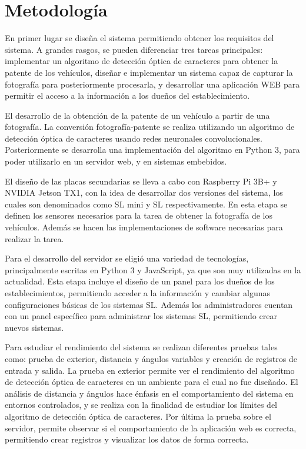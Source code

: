 \section{Metodología}

En primer lugar se diseña el sistema permitiendo obtener los requisitos del sistema. A grandes rasgos, se pueden diferenciar tres tareas principales: implementar un algoritmo de detección óptica de caracteres para obtener la patente de los vehículos, diseñar e implementar un sistema capaz de capturar la fotografía para posteriormente procesarla, y desarrollar una aplicación WEB para permitir el acceso a la información a los dueños del establecimiento.

El desarrollo de la obtención de la patente de un vehículo a partir de una fotografía. La conversión fotografía-patente se realiza utilizando un algoritmo de detección óptica de caracteres usando redes neuronales convolucionales. Posteriormente se desarrolla una implementación del algoritmo en Python 3, para poder utilizarlo en un servidor web, y en sistemas embebidos.

El diseño de las placas secundarias se lleva a cabo con Raspberry Pi 3B+ y NVIDIA Jetson TX1, con la idea de desarrollar dos versiones del sistema, los cuales son denominados como SL mini y SL respectivamente. En esta etapa se definen los sensores necesarios para la tarea de obtener la fotografía de los vehículos. Además se hacen las implementaciones de software necesarias para realizar la tarea.

Para el desarrollo del servidor se eligió una variedad de tecnologías, principalmente escritas en Python 3 y JavaScript, ya que son muy utilizadas en la actualidad. Esta etapa incluye el diseño de un panel para los dueños de los establecimientos, permitiendo acceder a la información y cambiar algunas configuraciones básicas de los sistemas SL. Además los administradores cuentan con un panel específico para administrar los sistemas SL, permitiendo crear nuevos sistemas.

Para estudiar el rendimiento del sistema se realizan diferentes pruebas tales como: prueba de exterior, distancia y ángulos variables y creación de registros de entrada y salida. La prueba en exterior permite ver el rendimiento del algoritmo de detección óptica de caracteres en un ambiente para el cual no fue diseñado. El análisis de distancia y ángulos hace énfasis en el comportamiento del sistema en entornos controlados, y se realiza con la finalidad de estudiar los límites del algoritmo de detección óptica de caracteres. Por última la prueba sobre el servidor, permite observar si el comportamiento de la aplicación web es correcta, permitiendo crear registros y visualizar los datos de forma correcta.

